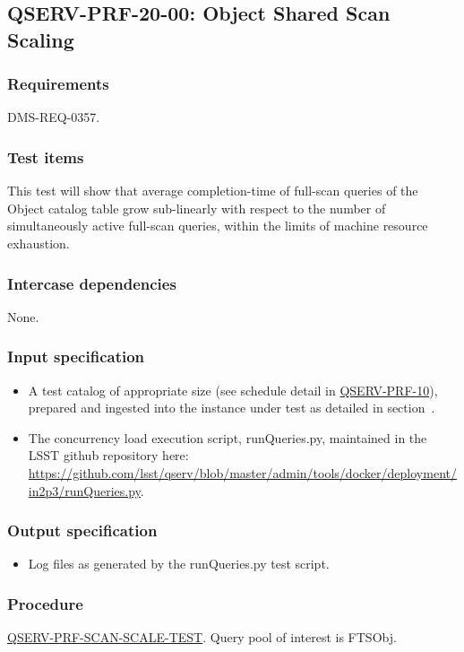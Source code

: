 \subsection{\textsc{QSERV-PRF-20-00}: Object Shared Scan Scaling}
\label{qserv-prf-20-00}

\subsubsection{Requirements}

DMS-REQ-0357.

\subsubsection{Test items}

This test will show that average completion-time of full-scan queries of the Object catalog table grow
sub-linearly with respect to the number of simultaneously active full-scan queries, within the limits of
machine resource exhaustion.

\subsubsection{Intercase dependencies}

None.

\subsubsection{Input specification}

\begin{itemize}

  \item{A test catalog of appropriate size (see schedule detail in \hyperref[qserv-prf-10]{\textsc{
  QSERV-PRF-10}}), prepared and ingested into the \product{} instance under test as detailed in
  section~.}

  \item{The concurrency load execution script, runQueries.py, maintained in the LSST \product{}
  github repository here: \url{https://github.com/lsst/qserv/blob/master/admin/tools/docker/deployment/in2p3/runQueries.py}}.

\end{itemize}

\subsubsection{Output specification}

\begin{itemize}
  \item{Log files as generated by the runQueries.py test script.}
\end{itemize}

\subsubsection{Procedure}

\hyperref[qserv-prf-scan-scale-test]{\textsc{QSERV-PRF-SCAN-SCALE-TEST}}.
Query pool of interest is FTSObj.
